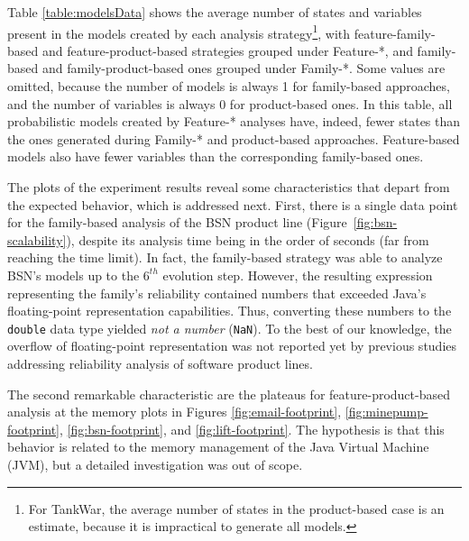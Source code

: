 Table \ref{table:modelsData} shows the average number of states and variables
present in the models created by each analysis strategy\footnote{For TankWar,
the average number of states in the product-based case is an estimate, because
it is impractical to generate all models.}, with feature-family-based and
feature-product-based strategies grouped under Feature-*, and family-based and
family-product-based ones grouped under Family-*.  Some values are omitted,
because the number of models is always 1 for family-based approaches, and the
number of variables is always 0 for product-based ones. In this table, all
probabilistic models created by Feature-* analyses have, indeed, fewer states
than the ones generated during Family-* and product-based approaches.
Feature-based models also have fewer variables than the corresponding
family-based ones.

The plots of the experiment results reveal some characteristics that depart from
the expected behavior, which is addressed next. First, there is a single data
point for the family-based analysis of the BSN product line
(Figure~\ref{fig:bsn-scalability}), despite its analysis time being in the order
of seconds (far from reaching the time limit).  In fact, the family-based
strategy was able to analyze BSN's models up to the $6^{th}$ evolution step.
However, the resulting expression representing the family's reliability
contained numbers that exceeded Java's floating-point representation
capabilities.  Thus, converting these numbers to the \texttt{double} data type
yielded \emph{not a number} (\texttt{NaN}).  To the best of our knowledge, the
overflow of floating-point representation was not reported yet by previous
studies addressing reliability analysis of software product lines.

The second remarkable characteristic are the plateaus for feature-product-based
analysis at the memory plots in Figures \ref{fig:email-footprint},
\ref{fig:minepump-footprint}, \ref{fig:bsn-footprint}, and
\ref{fig:lift-footprint}.  The hypothesis is that this behavior is related to
the memory management of the Java Virtual Machine (JVM), but a detailed
investigation was out of scope.


